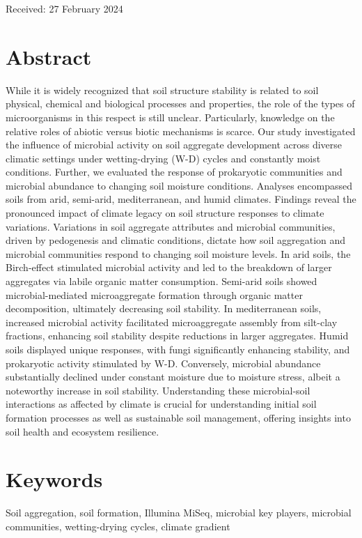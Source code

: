   \vspace{0.4cm}
  \begin{flushleft}
    Received: 27 February 2024
  \end{flushleft}
  \cleardoublepage

\section*{Abstract}

While it is widely recognized that soil structure stability is related to soil physical, chemical and biological processes and properties, the role of the types of microorganisms in this respect is still unclear. Particularly, knowledge on the relative roles of abiotic versus biotic mechanisms is scarce. Our study investigated the influence of microbial activity on soil aggregate development across diverse climatic settings under wetting-drying (W-D) cycles and constantly moist conditions. Further, we evaluated the response of prokaryotic communities and microbial abundance to changing soil moisture conditions. Analyses encompassed soils from arid, semi-arid, mediterranean, and humid climates. Findings reveal the pronounced impact of climate legacy on soil structure responses to climate variations. Variations in soil aggregate attributes and microbial communities, driven by pedogenesis and climatic conditions, dictate how soil aggregation and microbial communities respond to changing soil moisture levels. In arid soils, the Birch-effect stimulated microbial activity and led to the breakdown of larger aggregates via labile organic matter consumption. Semi-arid soils showed microbial-mediated microaggregate formation through organic matter decomposition, ultimately decreasing soil stability. In mediterranean soils, increased microbial activity facilitated microaggregate assembly from silt-clay fractions, enhancing soil stability despite reductions in larger aggregates. Humid soils displayed unique responses, with fungi significantly enhancing stability, and prokaryotic activity stimulated by W-D. Conversely, microbial abundance substantially declined under constant moisture due to moisture stress, albeit a noteworthy increase in soil stability. Understanding these microbial-soil interactions as affected by climate is crucial for understanding initial soil formation processes as well as sustainable soil management, offering insights into soil health and ecosystem resilience.

\section*{Keywords} %
Soil aggregation, soil formation, Illumina MiSeq, microbial key players, microbial communities, wetting-drying cycles, climate gradient

